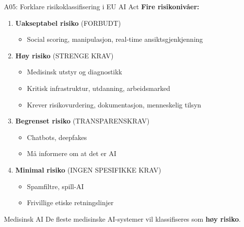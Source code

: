 \documentclass[aspectratio=169, 10pt]{beamer}
\begin{document}
\begin{frame}{A05: Forklare risikoklassifisering i EU AI Act}
    \textbf{Fire risikonivåer:}
    
    \vspace{0.3cm}
    \begin{enumerate}
        \item \textbf{Uakseptabel risiko} (FORBUDT)
        \begin{itemize}
            \item Social scoring, manipulasjon, real-time ansiktsgjenkjenning
        \end{itemize}
        
        \item \textbf{Høy risiko} (STRENGE KRAV)
        \begin{itemize}
            \item Medisinsk utstyr og diagnostikk
            \item Kritisk infrastruktur, utdanning, arbeidsmarked
            \item Krever risikovurdering, dokumentasjon, menneskelig tilsyn
        \end{itemize}
        
        \item \textbf{Begrenset risiko} (TRANSPARENSKRAV)
        \begin{itemize}
            \item Chatbots, deepfakes
            \item Må informere om at det er AI
        \end{itemize}
        
        \item \textbf{Minimal risiko} (INGEN SPESIFIKKE KRAV)
        \begin{itemize}
            \item Spamfiltre, spill-AI
            \item Frivillige etiske retningslinjer
        \end{itemize}
    \end{enumerate}
    
    \begin{alertblock}{Medisinsk AI}
        De fleste medisinske AI-systemer vil klassifiseres som \textbf{høy risiko}.
    \end{alertblock}
\end{frame}
\end{document}
